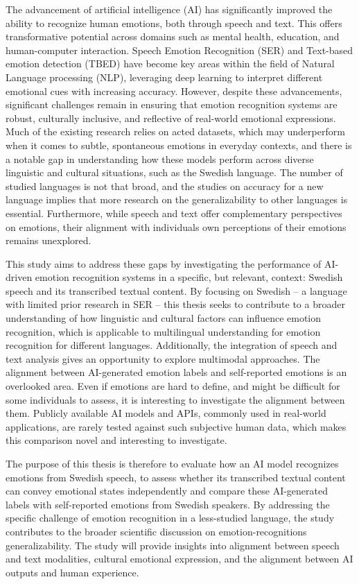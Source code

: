 The advancement of artificial intelligence (AI) has significantly improved the ability to recognize human emotions, both through speech and text. This offers transformative potential across domains such as mental health, education, and human-computer interaction. Speech Emotion Recognition (SER) and Text-based emotion detection (TBED) have become key areas within the field of Natural Language processing (NLP), leveraging deep learning to interpret different emotional cues with increasing accuracy. However, despite these advancements, significant challenges remain in ensuring that emotion recognition systems are robust, culturally inclusive, and reflective of real-world emotional expressions. Much of the existing research relies on acted datasets, which may underperform when it comes to subtle, spontaneous emotions in everyday contexts, and there is a notable gap in understanding how these models perform across diverse linguistic and cultural situations, such as the Swedish language. The number of studied languages is not that broad, and the studies on accuracy for a new language implies that more research on the generalizability to other languages is essential. Furthermore, while speech and text offer complementary perspectives on emotions, their alignment with individuals own perceptions of their emotions remains unexplored. 

This study aims to address these gaps by investigating the performance of AI-driven emotion recognition systems in a specific, but relevant, context: Swedish speech and its transcribed textual content. By focusing on Swedish – a language with limited prior research in SER – this thesis seeks to contribute to a broader understanding of how linguistic and cultural factors can influence emotion recognition, which is applicable to multilingual understanding for emotion recognition for different languages. Additionally, the integration of speech and text analysis gives an opportunity to explore multimodal approaches. The alignment between AI-generated emotion labels and self-reported emotions is an overlooked area. Even if emotions are hard to define, and might be difficult for some individuals to assess, it is interesting to investigate the alignment between them. Publicly available AI models and APIs, commonly used in real-world applications, are rarely tested against such subjective human data, which makes this comparison novel and interesting to investigate.
   
The purpose of this thesis is therefore to evaluate how an AI model recognizes emotions from Swedish speech, to assess whether its transcribed textual content can convey emotional states independently and compare these AI-generated labels with self-reported emotions from Swedish speakers. By addressing the specific challenge of emotion recognition in a less-studied language, the study contributes to the broader scientific discussion on emotion-recognitions generalizability. The study will provide insights into alignment between speech and text modalities, cultural emotional expression, and the alignment between AI outputs and human experience.  

